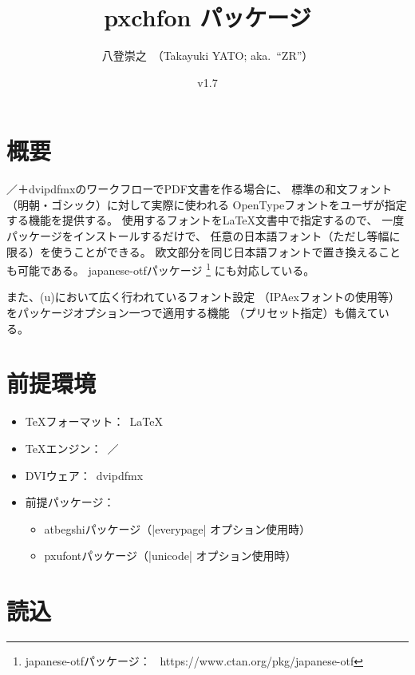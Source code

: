\documentclass[uplatex,dvipdfmx,a4paper]{jsarticle}
\newcommand{\PkgVersion}{1.7}
\newcommand{\PkgDate}{2019/11/19}
\newcommand{\Pkg}[1]{\textsf{#1}}
\newcommand{\Means}{：\ }
\begin{document}
\title{\Pkg{pxchfon} パッケージ}
\author{八登崇之\ （Takayuki YATO; aka.~``ZR''）}
\date{v\PkgVersion\quad[\PkgDate]}
\maketitle
\tableofcontents

\section{概要}

{\pLaTeX}／{\upLaTeX}＋dvipdfmxのワークフローでPDF文書を作る場合に、
標準の和文フォント（明朝・ゴシック）に対して実際に使われる
OpenTypeフォントをユーザが指定する機能を提供する。
使用するフォントを{\LaTeX}文書中で指定するので、
一度パッケージをインストールするだけで、
任意の日本語フォント（ただし等幅に限る）を使うことができる。
欧文部分を同じ日本語フォントで置き換えることも可能である。
\Pkg{japanese-otf}パッケージ%
\footnote{\Pkg{japanese-otf}パッケージ\Means
  https://www.ctan.org/pkg/japanese-otf}%
にも対応している。

また、{(u)\pLaTeX}において広く行われているフォント設定
（IPAexフォントの使用等）をパッケージオプション一つで適用する機能
（プリセット指定）も備えている。

\section{前提環境}

\begin{itemize}
\item {\TeX}フォーマット\Means {\LaTeX}
\item {\TeX}エンジン\Means {\pTeX}／{\upTeX}
\item DVIウェア\Means dvipdfmx
\item 前提パッケージ\Means
  \begin{itemize}
  \item \Pkg{atbegshi}パッケージ（|everypage| オプション使用時）
  \item \Pkg{pxufont}パッケージ（|unicode| オプション使用時）
  \end{itemize}
\end{itemize}

\section{読込}
\label{sec:Loading}
\end{document}
